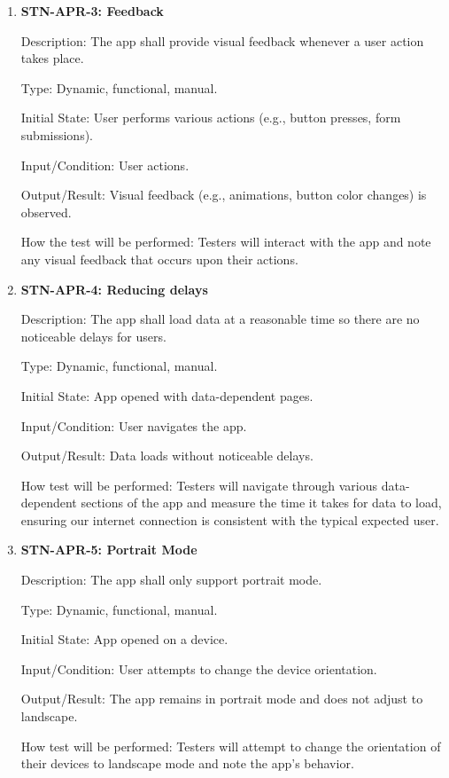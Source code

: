 \documentclass[12pt, titlepage]{article}
\begin{document}
\begin{enumerate}
        \item \textbf{STN-APR-3: Feedback}

        Description: The app shall provide visual feedback whenever a user action takes place.

        Type: Dynamic, functional, manual.

        Initial State: User performs various actions (e.g., button presses, form submissions).

        Input/Condition: User actions.

        Output/Result: Visual feedback (e.g., animations, button color changes) is observed.

        How the test will be performed: Testers will interact with the app and note any visual feedback that occurs upon their actions.


        \item \textbf{STN-APR-4: Reducing delays}

        Description: The app shall load data at a reasonable time so there are no noticeable delays for users.

        Type: Dynamic, functional, manual.

        Initial State: App opened with data-dependent pages.

        Input/Condition: User navigates the app.

        Output/Result: Data loads without noticeable delays.

        How test will be performed: Testers will navigate through various data-dependent sections of the app and measure the time it takes for data to load, ensuring our internet connection is consistent with the typical expected user.


        \item {\textbf{STN-APR-5: Portrait Mode}}

        Description: The app shall only support portrait mode.

        Type: Dynamic, functional, manual.

        Initial State: App opened on a device.

        Input/Condition: User attempts to change the device orientation.

        Output/Result: The app remains in portrait mode and does not adjust to landscape.

        How test will be performed: Testers will attempt to change the orientation of their devices to landscape mode and note the app's behavior.

    \end{enumerate}
\end{document}

